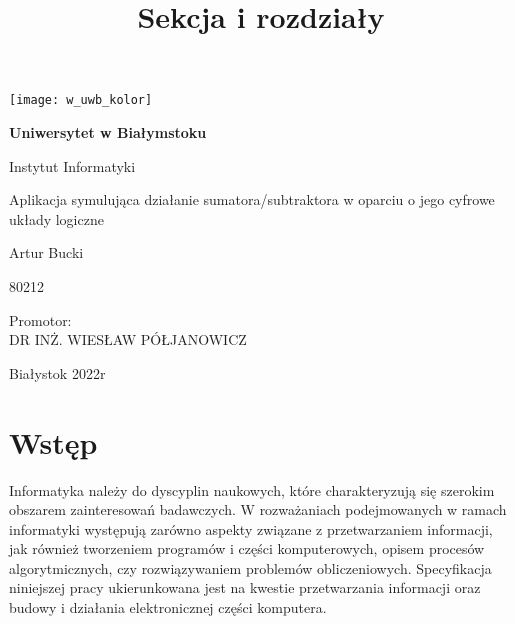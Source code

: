 \documentclass[12pt, a4paper, onside, polish]{article}				%
\title{Sekcja i rozdziały}						%
\begin{document}
\begin{titlepage}
	\begin{center}
	
		\texttt{[image: w\_uwb\_kolor]}
		
		\vspace{2cm}

	
		\Huge
        		\textbf{Uniwersytet w Białymstoku}
        		
        		\vspace{0.5cm}
        		\LARGE
        		Instytut Informatyki
        		
        		\vspace{1cm}
        		\LARGE
        		Aplikacja symulująca działanie sumatora/subtraktora w oparciu o jego cyfrowe układy logiczne 
        		
        		\vspace{1.5cm}
        		\large
        		Artur Bucki
        		
        		\large
        		80212
        		
        		\vspace{0.5cm}
        		
		\begin{flushright}
		Promotor:\\
		DR INŻ. WIESŁAW PÓŁJANOWICZ\\
		\end{flushright}


		\vspace*{\fill}
		\large
		Białystok 2022r
        		
	\end{center}
\end{titlepage}





\tableofcontents
\cleardoublepage


\section{Wstęp}
Informatyka należy do dyscyplin naukowych, które charakteryzują się szerokim obszarem zainteresowań badawczych. W rozważaniach podejmowanych w ramach informatyki występują zarówno aspekty związane z przetwarzaniem informacji, jak również tworzeniem programów i części komputerowych, opisem procesów algorytmicznych, czy rozwiązywaniem problemów obliczeniowych. Specyfikacja niniejszej pracy ukierunkowana jest na kwestie przetwarzania informacji oraz budowy i działania elektronicznej części komputera.
\end{document}
